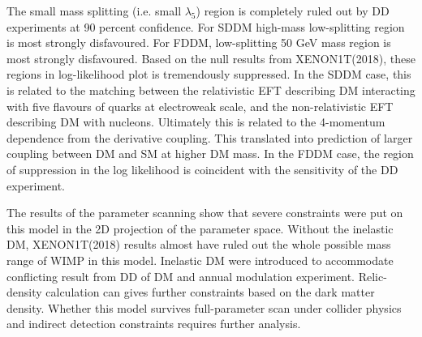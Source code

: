 \documentclass[12pt]{article}
\begin{document}
The small mass splitting (i.e. small $\lambda_5$) region is completely ruled out by DD experiments at 90 percent confidence. For SDDM high-mass low-splitting region is most strongly disfavoured. For FDDM, low-splitting 50 GeV mass region is most strongly disfavoured. Based on the null results from XENON1T(2018), these regions in log-likelihood plot is tremendously suppressed. In the SDDM case, this is related to the matching between the relativistic EFT describing DM interacting with five flavours of quarks at electroweak scale, and the non-relativistic EFT describing DM with nucleons. Ultimately this is related to the 4-momentum dependence from the derivative coupling. This translated into prediction of larger coupling between DM and SM at higher DM mass. In the FDDM case, the region of suppression in the log likelihood is coincident with the sensitivity of the DD experiment. 




The results of the parameter scanning show that severe constraints were put on this model in the 2D projection of the  parameter space. Without the inelastic DM,  XENON1T(2018) results almost have ruled out the whole possible mass range of WIMP in this model. Inelastic DM were introduced to accommodate conflicting result from DD of DM and annual modulation experiment. Relic-density calculation can gives further constraints based on the dark matter density. Whether this model survives full-parameter scan under collider physics and indirect detection constraints requires further analysis. 
\end{document}

